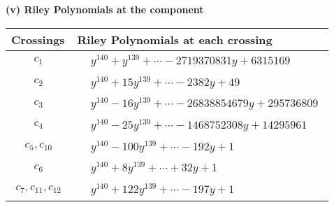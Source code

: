 \documentclass[1p]{elsarticle_modified}
\theoremstyle{definition}
\begin{document}
\newpage\renewcommand{\arraystretch}{1}
\flushleft \textbf{(v) Riley Polynomials at the component}\newline \\
\begin{tabular}{m{50pt}|m{274pt}}
Crossings & \hspace{64pt}Riley Polynomials at each crossing \\
\hline $$\begin{aligned}c_{1}\end{aligned}$$&$\begin{aligned}
&y^{140}+y^{139}+\cdots-2719370831 y+6315169
\end{aligned}$\\
\hline $$\begin{aligned}c_{2}\end{aligned}$$&$\begin{aligned}
&y^{140}+15 y^{139}+\cdots-2382 y+49
\end{aligned}$\\
\hline $$\begin{aligned}c_{3}\end{aligned}$$&$\begin{aligned}
&y^{140}-16 y^{139}+\cdots-26838854679 y+295736809
\end{aligned}$\\
\hline $$\begin{aligned}c_{4}\end{aligned}$$&$\begin{aligned}
&y^{140}-25 y^{139}+\cdots-1468752308 y+14295961
\end{aligned}$\\
\hline $$\begin{aligned}c_{5},c_{10}\end{aligned}$$&$\begin{aligned}
&y^{140}-100 y^{139}+\cdots-192 y+1
\end{aligned}$\\
\hline $$\begin{aligned}c_{6}\end{aligned}$$&$\begin{aligned}
&y^{140}+8 y^{139}+\cdots+32 y+1
\end{aligned}$\\
\hline $$\begin{aligned}c_{7},c_{11},c_{12}\end{aligned}$$&$\begin{aligned}
&y^{140}+122 y^{139}+\cdots-197 y+1
\end{aligned}$\\

\end{tabular}
\end{document}
